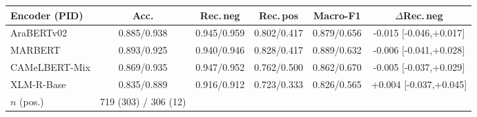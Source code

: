 \begin{tabular}{lccccc}
\toprule
\textbf{Encoder (PID)} & \textbf{Acc.} & \textbf{Rec.\,neg} & \textbf{Rec.\,pos} & \textbf{Macro-F1} & \textbf{$\Delta$Rec.\,neg} \\
\midrule
AraBERTv02 & 0.885/0.938 & 0.945/0.959 & 0.802/0.417 & 0.879/0.656 & -0.015 {\scriptsize[-0.046,+0.017]} \\
MARBERT & 0.893/0.925 & 0.940/0.946 & 0.828/0.417 & 0.889/0.632 & -0.006 {\scriptsize[-0.041,+0.028]} \\
CAMeLBERT-Mix & 0.869/0.935 & 0.947/0.952 & 0.762/0.500 & 0.862/0.670 & -0.005 {\scriptsize[-0.037,+0.029]} \\
XLM-R-Base & 0.835/0.889 & 0.916/0.912 & 0.723/0.333 & 0.826/0.565 & +0.004 {\scriptsize[-0.037,+0.045]} \\
\midrule
$n$ (pos.) & 719 (303) / 306 (12) & & & & \\
\bottomrule
\end{tabular}
